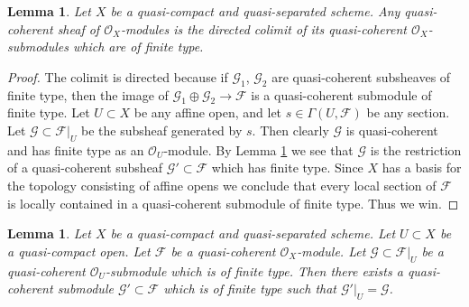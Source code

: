 \documentclass{amsart}
\theoremstyle{plain}
\newtheorem{lemma}[subsection]{Lemma}
\theoremstyle{definition}
\theoremstyle{remark}
\numberwithin{equation}{subsection}
\begin{document}
\begin{lemma}
\label{properties-lemma-quasi-coherent-colimit-finite-type}
Let $X$ be a quasi-compact and quasi-separated scheme.
Any quasi-coherent sheaf of $\mathcal{O}_X$-modules
is the directed colimit of its quasi-coherent
$\mathcal{O}_X$-submodules which are of finite type.
\end{lemma}

\begin{proof}
The colimit is directed because if $\mathcal{G}_1$, $\mathcal{G}_2$
are quasi-coherent subsheaves of finite type, then the image of
$\mathcal{G}_1 \oplus \mathcal{G}_2 \to \mathcal{F}$ is
a quasi-coherent submodule of finite type.
Let $U \subset X$ be any affine open, and let
$s \in \Gamma(U, \mathcal{F})$ be any section.
Let $\mathcal{G} \subset \mathcal{F}|_U$ be the
subsheaf generated by $s$. Then clearly $\mathcal{G}$
is quasi-coherent and has finite type as an $\mathcal{O}_U$-module.
By Lemma \ref{properties-lemma-extend} we see that $\mathcal{G}$ is the restriction
of a quasi-coherent subsheaf $\mathcal{G}' \subset \mathcal{F}$
which has finite type. Since $X$ has a basis for the topology consisting
of affine opens we conclude that every local section of
$\mathcal{F}$ is locally contained in a quasi-coherent submodule
of finite type. Thus we win.
\end{proof}


\begin{lemma}
\label{properties-lemma-extend}
Let $X$ be a quasi-compact and quasi-separated scheme.
Let $U \subset X$ be a quasi-compact open.
Let $\mathcal{F}$ be a quasi-coherent $\mathcal{O}_X$-module.
Let $\mathcal{G} \subset \mathcal{F}|_U$ be a quasi-coherent
$\mathcal{O}_U$-submodule which is of finite type. Then
there exists a quasi-coherent submodule $\mathcal{G}' \subset \mathcal{F}$
which is of finite type such that $\mathcal{G}'|_U = \mathcal{G}$.
\end{lemma}
\end{document}
